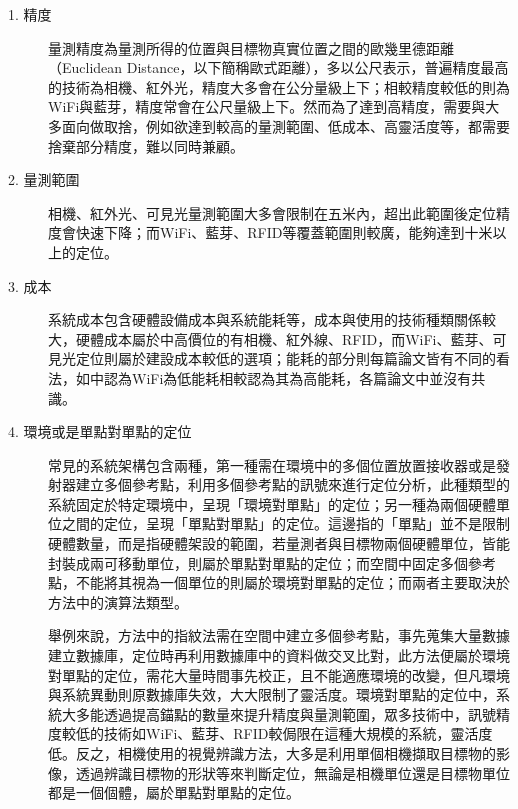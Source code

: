 \begin{description}
    \item[1. 精度]\hfill 
    
    \qquad
    量測精度為量測所得的位置與目標物真實位置之間的歐幾里德距離（Euclidean Distance，以下簡稱歐式距離），多以公尺表示\cite{survey:indoor_wayfinding}，普遍精度最高的技術為相機、紅外光\cite{survey_indoor2014}，精度大多會在公分量級上下；相較精度較低的則為WiFi與藍芽，精度常會在公尺量級上下\cite{survey_indoor2014}。然而為了達到高精度，需要與大多面向做取捨\cite{survey:indoor_wayfinding}，例如欲達到較高的量測範圍、低成本、高靈活度等，都需要捨棄部分精度，難以同時兼顧。
    
    \item[2. 量測範圍] \hfill  
    
    \qquad
    相機、紅外光、可見光量測範圍大多會限制在五米內，超出此範圍後定位精度會快速下降；而WiFi、藍芽、RFID等覆蓋範圍則較廣，能夠達到十米以上的定位\cite{survey_indoor2014}。
    
    \item[3. 成本] \hfill 
    
    \qquad
    系統成本包含硬體設備成本與系統能耗等，成本與使用的技術種類關係較大，硬體成本屬於中高價位的有相機、紅外線、RFID，而WiFi、藍芽、可見光定位則屬於建設成本較低的選項；能耗的部分則每篇論文皆有不同的看法，如\cite{survey:radio}中認為WiFi為低能耗相較\cite{survey:indoor_wayfinding}認為其為高能耗，各篇論文中並沒有共識。
    
    \item[4. 環境或是單點對單點的定位] \hfill 
    
    \qquad
    常見的系統架構包含兩種，第一種需在環境中的多個位置放置接收器或是發射器建立多個參考點，利用多個參考點的訊號來進行定位分析，此種類型的系統固定於特定環境中，呈現「環境對單點」的定位；另一種為兩個硬體單位之間的定位，呈現「單點對單點」的定位。這邊指的「單點」並不是限制硬體數量，而是指硬體架設的範圍，若量測者與目標物兩個硬體單位，皆能封裝成兩可移動單位，則屬於單點對單點的定位；而空間中固定多個參考點，不能將其視為一個單位的則屬於環境對單點的定位；而兩者主要取決於方法中的演算法類型。

    \qquad
    舉例來說，方法中的指紋法需在空間中建立多個參考點，事先蒐集大量數據建立數據庫，定位時再利用數據庫中的資料做交叉比對，此方法便屬於環境對單點的定位，需花大量時間事先校正，且不能適應環境的改變，但凡環境與系統異動則原數據庫失效，大大限制了靈活度。環境對單點的定位中，系統大多能透過提高錨點的數量來提升精度與量測範圍，眾多技術中，訊號精度較低的技術如WiFi、藍芽、RFID較侷限在這種大規模的系統，靈活度低。反之，相機使用的視覺辨識方法，大多是利用單個相機擷取目標物的影像，透過辨識目標物的形狀等來判斷定位，無論是相機單位還是目標物單位都是一個個體，屬於單點對單點的定位。


\end{description}
